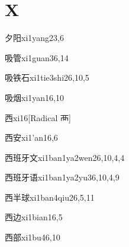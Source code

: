 
\section*{X}

\begin{verbete}{夕阳}{xi1yang2}{3,6}
\end{verbete}

\begin{verbete}{吸管}{xi1guan3}{6,14}
\end{verbete}

\begin{verbete}{吸铁石}{xi1tie3shi2}{6,10,5}
\end{verbete}

\begin{verbete}{吸烟}{xi1yan1}{6,10}
\end{verbete}

\begin{verbete}{西}{xi1}{6}[Radical 襾]
\end{verbete}

\begin{verbete}{西安}{xi1'an1}{6,6}
\end{verbete}

\begin{verbete}{西班牙文}{xi1ban1ya2wen2}{6,10,4,4}
\end{verbete}

\begin{verbete}{西班牙语}{xi1ban1ya2yu3}{6,10,4,9}
\end{verbete}

\begin{verbete}{西半球}{xi1ban4qiu2}{6,5,11}
\end{verbete}

\begin{verbete}{西边}{xi1bian1}{6,5}
\end{verbete}

\begin{verbete}{西部}{xi1bu4}{6,10}
\end{verbete}

